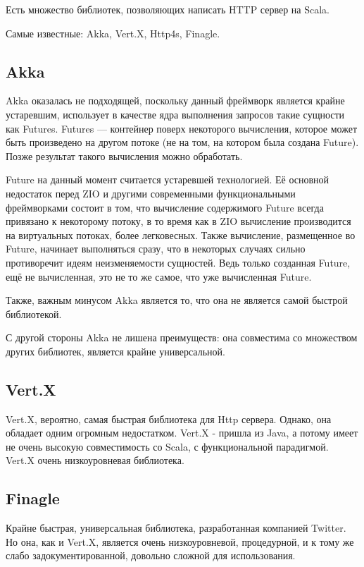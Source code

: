 \documentclass[14pt]{extarticle}
\begin{document}
    Есть множество библиотек, позволяющих написать HTTP сервер на Scala.

    Самые известные: Akka, Vert.X, Http4s, Finagle.

    \subsection{Akka\cite{akkahttp}}
    Akka оказалась не подходящей, поскольку данный фреймворк является крайне устаревшим, использует в качестве ядра выполнения
    запросов такие сущности как Futures. Futures --- контейнер поверх некоторого вычисления, которое может быть
    произведено на другом потоке (не на том, на котором была создана Future). Позже результат такого вычисления можно
    обработать.

    Future на данный момент считается устаревшей технологией. Её основной недостаток перед ZIO и другими
    современными функциональными фреймворками состоит в том, что
    вычисление содержимого Future всегда привязано к некоторому потоку, в то время как в ZIO вычисление производится
    на виртуальных потоках, более легковесных. Также вычисление, размещенное во Future, начинает выполняться сразу,
    что в некоторых случаях сильно противоречит идеям неизменяемости сущностей. Ведь только созданная Future, ещё не
    вычисленная, это не то же самое, что уже вычисленная Future.

    Также, важным минусом Akka является то, что она не является самой быстрой библиотекой.

    С другой стороны Akka не лишена преимуществ: она совместима со множеством других библиотек, является крайне
    универсальной.

    \subsection{Vert.X\cite{vertx}}
    Vert.X, вероятно, самая быстрая библиотека для Http сервера. Однако, она обладает одним огромным недостатком. 
    Vert.X - пришла из Java, а потому имеет не очень высокую совместимость со Scala, с функциональной парадигмой.
    Vert.X очень низкоуровневая библиотека.
    
    \subsection{Finagle\cite{finagle}}
    Крайне быстрая, универсальная библиотека, разработанная компанией Twitter. Но она, как и Vert.X, является очень
    низкоуровневой, процедурной, и к тому же слабо задокументированной, довольно сложной для использования.
    
\end{document}
